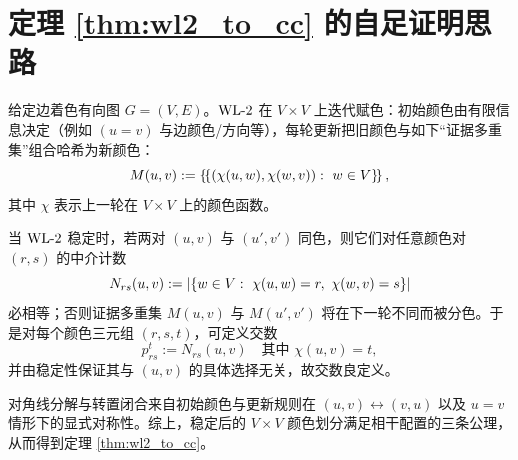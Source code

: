 
\section{定理 \ref{thm:wl2_to_cc} 的自足证明思路}

给定边着色有向图 $G=(V,E)$。$\mathrm{WL}\text{-}2$ 在 $V\times V$ 上迭代赋色：初始颜色由有限信息决定（例如 $(u=v)$ 与边颜色/方向等），每轮更新把旧颜色与如下“证据多重集”组合哈希为新颜色：
$$
M(u,v):=\multiset{(\chi(u,w),\chi(w,v)):\ w\in V},
$$
其中 $\chi$ 表示上一轮在 $V\times V$ 上的颜色函数。

当 $\mathrm{WL}\text{-}2$ 稳定时，若两对 $(u,v)$ 与 $(u',v')$ 同色，则它们对任意颜色对 $(r,s)$ 的中介计数
$$
N_{rs}(u,v):=\abs{\{w\in V:\ \chi(u,w)=r,\ \chi(w,v)=s\}}
$$
必相等；否则证据多重集 $M(u,v)$ 与 $M(u',v')$ 将在下一轮不同而被分色。于是对每个颜色三元组 $(r,s,t)$，可定义交数
$$
p_{rs}^t:=N_{rs}(u,v)\quad \text{其中 } \chi(u,v)=t,
$$
并由稳定性保证其与 $(u,v)$ 的具体选择无关，故交数良定义。

对角线分解与转置闭合来自初始颜色与更新规则在 $(u,v)\leftrightarrow (v,u)$ 以及 $u=v$ 情形下的显式对称性。综上，稳定后的 $V\times V$ 颜色划分满足相干配置的三条公理，从而得到定理 \ref{thm:wl2_to_cc}。


